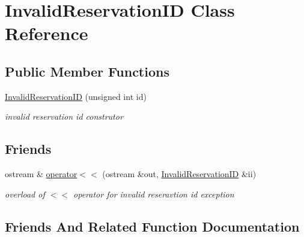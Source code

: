 \hypertarget{class_invalid_reservation_i_d}{}\section{Invalid\+Reservation\+ID Class Reference}
\label{class_invalid_reservation_i_d}
\subsection*{Public Member Functions}
\begin{DoxyCompactItemize}
\item 
\hypertarget{class_invalid_reservation_i_d_a7515283bffcb85f4d7dca12dd8ef5b85}{}\label{class_invalid_reservation_i_d_a7515283bffcb85f4d7dca12dd8ef5b85} 
\hyperlink{class_invalid_reservation_i_d_a7515283bffcb85f4d7dca12dd8ef5b85}{Invalid\+Reservation\+ID} (unsigned int id)
\begin{DoxyCompactList}\small\item\em invalid reservation id construtor \end{DoxyCompactList}\end{DoxyCompactItemize}
\subsection*{Friends}
\begin{DoxyCompactItemize}
\item 
ostream \& \hyperlink{class_invalid_reservation_i_d_a37112c7064f2db8b764ba7f0b9b04ded}{operator$<$$<$} (ostream \&out, \hyperlink{class_invalid_reservation_i_d}{Invalid\+Reservation\+ID} \&ii)
\begin{DoxyCompactList}\small\item\em overload of $<$$<$ operator for invalid reseravtion id exception \end{DoxyCompactList}\end{DoxyCompactItemize}


\subsection{Friends And Related Function Documentation}
\hypertarget{class_invalid_reservation_i_d_a37112c7064f2db8b764ba7f0b9b04ded}{}\label{class_invalid_reservation_i_d_a37112c7064f2db8b764ba7f0b9b04ded} 
